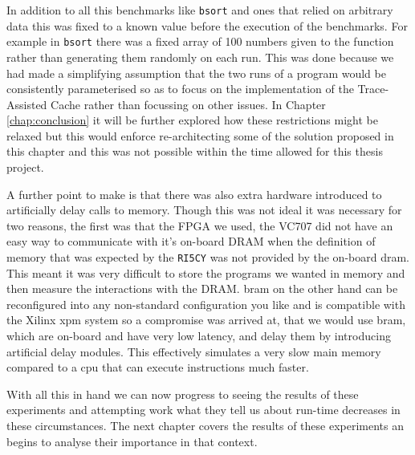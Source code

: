 In addition to all this benchmarks like \texttt{bsort} and ones that relied on arbitrary data this was fixed to a known value before the execution of the benchmarks. For example in \texttt{bsort} there was a fixed array of 100 numbers given to the function rather than generating them randomly on each run. This was done because we had made a simplifying assumption that the two runs of a program would be consistently parameterised so as to focus on the implementation of the Trace-Assisted Cache rather than focussing on other issues. In Chapter \ref{chap:conclusion} it will be further explored how these restrictions might be relaxed but this would enforce re-architecting some of the solution proposed in this chapter and this was not possible within the time allowed for this thesis project.

A further point to make is that there was also extra hardware introduced to artificially delay calls to memory. Though this was not ideal it was necessary for two reasons, the first was that the FPGA we used, the VC707 did not have an easy way to communicate with it's on-board DRAM when the definition of memory that was expected by the \texttt{RI5CY} was not provided by the on-board \gls{dram}. This meant it was very difficult to store the programs we wanted in memory and then measure the interactions with the DRAM. \gls{bram} on the other hand can be reconfigured into any non-standard configuration you like and is compatible with the Xilinx \gls{xpm} system so a compromise was arrived at, that we would use \gls{bram}, which are on-board and have very low latency, and delay them by introducing artificial delay modules. This effectively simulates a very slow main memory compared to a \gls{cpu} that can execute instructions much faster.

With all this in hand we can now progress to seeing the results of these experiments and attempting work what they tell us about run-time decreases in these circumstances. The next chapter covers the results of these experiments an begins to analyse their importance in that context.
